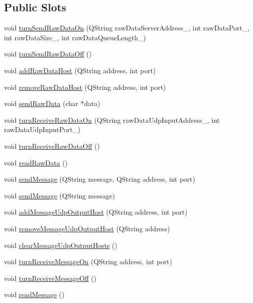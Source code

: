 \subsection*{Public Slots}
\begin{DoxyCompactItemize}
\item 
void \hyperlink{classSbs2NetworkHandler_a442ac8b20364e99764921ccfcee133a5}{turn\-Send\-Raw\-Data\-On} (Q\-String raw\-Data\-Server\-Address\-\_\-, int raw\-Data\-Port\-\_\-, int raw\-Data\-Size\-\_\-, int raw\-Data\-Queue\-Length\-\_\-)
\item 
void \hyperlink{classSbs2NetworkHandler_aa2af80c37111b3fdfa2c45b0194d1b02}{turn\-Send\-Raw\-Data\-Off} ()
\item 
void \hyperlink{classSbs2NetworkHandler_a88a1d746fd4eec22f393964fea5e5a11}{add\-Raw\-Data\-Host} (Q\-String address, int port)
\item 
void \hyperlink{classSbs2NetworkHandler_aded95af0fab1947e3a2c6e09d02f3464}{remove\-Raw\-Data\-Host} (Q\-String address, int port)
\item 
void \hyperlink{classSbs2NetworkHandler_a450fb80b4be000f8768c0c8b0e14e5c1}{send\-Raw\-Data} (char $\ast$data)
\item 
void \hyperlink{classSbs2NetworkHandler_a71d931b6624b6811992117db7d07d86c}{turn\-Receive\-Raw\-Data\-On} (Q\-String raw\-Data\-Udp\-Input\-Address\-\_\-, int raw\-Data\-Udp\-Input\-Port\-\_\-)
\item 
void \hyperlink{classSbs2NetworkHandler_a7a442ffbe3784b619645f773f11b5415}{turn\-Receive\-Raw\-Data\-Off} ()
\item 
void \hyperlink{classSbs2NetworkHandler_a7c894803abb0cf6066d324434614e59e}{read\-Raw\-Data} ()
\item 
void \hyperlink{classSbs2NetworkHandler_aaef038ae07bba835f767f525024885de}{send\-Message} (Q\-String message, Q\-String address, int port)
\item 
void \hyperlink{classSbs2NetworkHandler_a5859053ca998f4cbfccec0110417f3aa}{send\-Message} (Q\-String message)
\item 
void \hyperlink{classSbs2NetworkHandler_afffcfd11f6d08aeb0715414f1023ca31}{add\-Message\-Udp\-Output\-Host} (Q\-String address, int port)
\item 
void \hyperlink{classSbs2NetworkHandler_a55b23c60e565a927e18e53b8163a6867}{remove\-Message\-Udp\-Output\-Host} (Q\-String address)
\item 
void \hyperlink{classSbs2NetworkHandler_a11cf3eba00cda5a186318fc1ebe0b5f8}{clear\-Message\-Udp\-Output\-Hosts} ()
\item 
void \hyperlink{classSbs2NetworkHandler_a702a02dcef9a5c35a6964e40a434b1d0}{turn\-Receive\-Message\-On} (Q\-String address, int port)
\item 
void \hyperlink{classSbs2NetworkHandler_a698d27f3ed1efe4c7c050b764a3e98ac}{turn\-Receive\-Message\-Off} ()
\item 
void \hyperlink{classSbs2NetworkHandler_afeb3b4208880d2a902aa77dc02876773}{read\-Message} ()
\end{DoxyCompactItemize}
